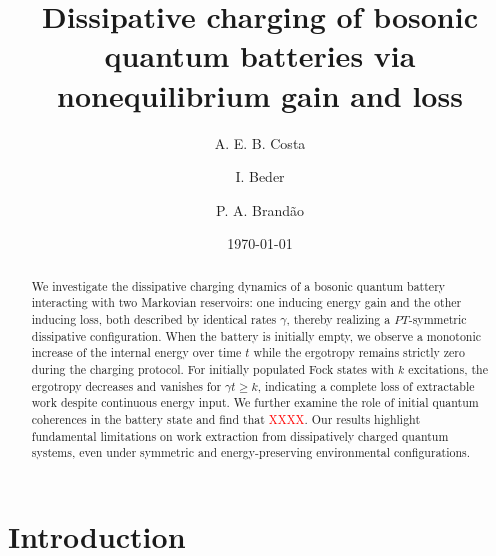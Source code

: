 \documentclass[%
reprint,
superscriptaddress,
amsmath,amssymb,
aps,
pra,
]{revtex4-2}
\begin{document}

\title{Dissipative charging of bosonic quantum batteries via nonequilibrium gain and loss}%

\author{A. E. B. Costa}
\author{I. Beder}

\author{P. A. Brand\~ao}
 

\date{\today}%

\begin{abstract}
We investigate the dissipative charging dynamics of a bosonic quantum battery interacting with two Markovian reservoirs: one inducing energy gain and the other inducing loss, both described by identical rates $\gamma$, thereby realizing a $PT$-symmetric dissipative configuration. When the battery is initially empty, we observe a monotonic increase of the internal energy over time $t$ while the ergotropy remains strictly zero during the charging protocol. For initially populated Fock states with $k$ excitations, the ergotropy decreases and vanishes for $\gamma t \geq k$, indicating a complete loss of extractable work despite continuous energy input. We further examine the role of initial quantum coherences in the battery state and find that \textcolor{red}{XXXX}. Our results highlight fundamental limitations on work extraction from dissipatively charged quantum systems, even under symmetric and energy-preserving environmental configurations.
\end{abstract}

\maketitle


\section{Introduction}
\end{document}
